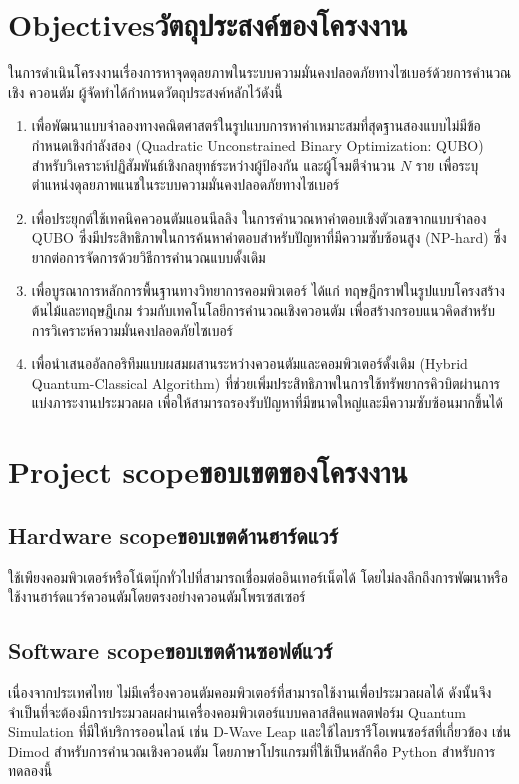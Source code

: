 \section{\ifenglish Objectives\else วัตถุประสงค์ของโครงงาน\fi}
\hspace{1.5em}ในการดำเนินโครงงานเรื่องการหาจุดดุลยภาพในระบบความมั่นคงปลอดภัยทางไซเบอร์ด้วยการคำนวณเชิง ควอนตัม ผู้จัดทำได้กำหนดวัตถุประสงค์หลักไว้ดังนี้
\begin{enumerate}
    \item เพื่อพัฒนาแบบจำลองทางคณิตศาสตร์ในรูปแบบการหาค่าเหมาะสมที่สุดฐานสองแบบไม่มีข้อกำหนดเชิงกำลังสอง (Quadratic Unconstrained Binary Optimization: QUBO) สำหรับวิเคราะห์ปฏิสัมพันธ์เชิงกลยุทธ์ระหว่างผู้ป้องกัน และผู้โจมตีจำนวน $N$ ราย เพื่อระบุตำแหน่งดุลยภาพแนชในระบบความมั่นคงปลอดภัยทางไซเบอร์ 
    \item เพื่อประยุกต์ใช้เทคนิคควอนตัมแอนนีลลิง ในการคำนวณหาคำตอบเชิงตัวเลขจากแบบจำลอง QUBO ซึ่งมีประสิทธิภาพในการค้นหาคำตอบสำหรับปัญหาที่มีความซับซ้อนสูง (NP-hard) ซึ่งยากต่อการจัดการด้วยวิธีการคำนวณแบบดั้งเดิม 
    \item เพื่อบูรณาการหลักการพื้นฐานทางวิทยาการคอมพิวเตอร์ ได้แก่ ทฤษฎีกราฟในรูปแบบโครงสร้างต้นไม้และทฤษฎีเกม ร่วมกับเทคโนโลยีการคำนวณเชิงควอนตัม เพื่อสร้างกรอบแนวคิดสำหรับการวิเคราะห์ความมั่นคงปลอดภัยไซเบอร์
    \item เพื่อนำเสนออัลกอริทึมแบบผสมผสานระหว่างควอนตัมและคอมพิวเตอร์ดั้งเดิม (Hybrid Quantum-Classical Algorithm) ที่ช่วยเพิ่มประสิทธิภาพในการใช้ทรัพยากรคิวบิตผ่านการแบ่งภาระงานประมวลผล เพื่อให้สามารถรองรับปัญหาที่มีขนาดใหญ่และมีความซับซ้อนมากขึ้นได้ 
\end{enumerate}

\section{\ifenglish Project scope\else ขอบเขตของโครงงาน\fi}
\subsection{\ifenglish Hardware scope\else ขอบเขตด้านฮาร์ดแวร์\fi}
ใช้เพียงคอมพิวเตอร์หรือโน้ตบุ๊กทั่วไปที่สามารถเชื่อมต่ออินเทอร์เน็ตได้ โดยไม่ลงลึกถึงการพัฒนาหรือใช้งานฮาร์ดแวร์ควอนตัมโดยตรงอย่างควอนตัมโพรเซสเซอร์ 

\subsection{\ifenglish Software scope\else ขอบเขตด้านซอฟต์แวร์\fi}
เนื่องจากประเทศไทย ไม่มีเครื่องควอนตัมคอมพิวเตอร์ที่สามารถใช้งานเพื่อประมวลผลได้ ดังนั้นจึงจำเป็นที่จะต้องมีการประมวลผลผ่านเครื่องคอมพิวเตอร์แบบคลาสสิคแพลตฟอร์ม Quantum Simulation ที่มีให้บริการออนไลน์ เช่น D-Wave Leap และใช้ไลบรารีโอเพนซอร์สที่เกี่ยวข้อง เช่น Dimod สำหรับการคำนวณเชิงควอนตัม โดยภาษาโปรแกรมที่ใช้เป็นหลักคือ Python สำหรับการทดลองนี้

